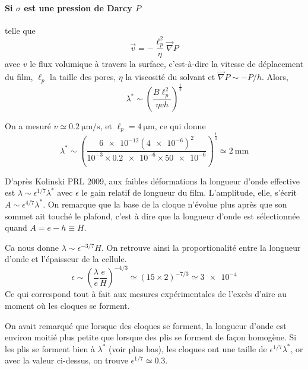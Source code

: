 \documentclass[12pt,a4paper]{article}
\begin{document}
\paragraph*{Si $\sigma$ est une pression de Darcy $P$} telle que 
\begin{equation}
\vec{v} = - \frac{\ell_p^2}{\eta}  \vec{\nabla} P
\label{eq:Darcy}
\end{equation}
avec $v$ le flux volumique à travers la surface, c'est-à-dire la vitesse de déplacement du film, $\ell_p$ la taille des pores, $\eta$ la viscosité du solvant et $\vec{\nabla} P \sim -P/h$. Alors,
\begin{equation}
\lambda^* \sim \left(\frac{B \ell_p^2}{\eta v h}\right)^\frac{1}{3}
\end{equation}

On a mesuré $v\simeq \SI{0.2}{\micro\metre\per\second}$, et $\ell_p=\SI{4}{\micro\metre}$, ce qui donne 
\begin{equation}
\lambda^* \sim \left(\frac{\num{6e-12} (\num{4e-6})^2}{10^{-3} \times \num{0.2e-6} \times \num{50e-6}}\right)^\frac{1}{3} \simeq \SI{2}{\milli\metre}
\end{equation}

D'après Kolinski PRL 2009, aux faibles déformations la longueur d'onde effective est $\lambda \sim \epsilon^{1/7} \lambda^*$ avec $\epsilon$ le gain relatif de longueur du film. L'amplitude, elle, s'écrit $A \sim \epsilon^{4/7} \lambda^*$. On remarque que la base de la cloque n'évolue plus après que son sommet ait touché le plafond, c'est à dire que la longueur d'onde est sélectionnée quand $A=e-h\equiv H$.

Ca nous donne $\lambda \sim \epsilon^{-3/7} H$. On retrouve ainsi la proportionalité entre la longueur d'onde et l'épaisseur de la cellule.
\begin{equation}
\epsilon \sim \left(\frac{\lambda}{e}\frac{e}{H}\right)^{-4/3} \simeq \left(15\times 2\right)^{-7/3} \simeq \num{3e-4}
\end{equation}
Ce qui correspond tout à fait aux mesures expérimentales de l'excès d'aire au moment où les cloques se forment.

On avait remarqué que lorsque des cloques se forment, la longueur d'onde est environ moitié plus petite que lorsque des plis se forment de façon homogène. Si les plis se forment bien à $\lambda^*$ (voir plus bas), les cloques ont une taille de $\epsilon^{1/7} \lambda^*$, or avec la valeur ci-dessus, on trouve $\epsilon^{1/7}\simeq 0.3$.

\pagebreak
\end{document}
